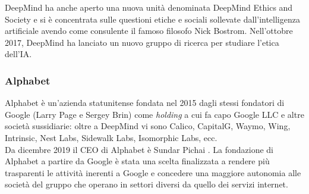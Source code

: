 {	\par DeepMind ha anche aperto una nuova unità denominata DeepMind Ethics and Society e si è concentrata sulle questioni etiche e sociali sollevate dall'intelligenza artificiale avendo come consulente il famoso filosofo Nick Bostrom. Nell'ottobre 2017, DeepMind ha lanciato un nuovo gruppo di ricerca per studiare l'etica dell'IA.
	
	\subsubsection{Alphabet}
	Alphabet è un'azienda statunitense fondata nel 2015 dagli stessi fondatori di Google (Larry Page e Sergey Brin) come \textit{holding} a cui fa capo Google LLC e altre società sussidiarie: oltre a DeepMind vi sono Calico, CapitalG, Waymo, Wing, Intrinsic, Nest Labs, Sidewalk Labs, Isomorphic Labs, ecc.\\ 
	Da dicembre 2019 il CEO di Alphabet è Sundar Pichai \supercite{cnbc}.
	La fondazione di Alphabet a partire da Google è stata una scelta finalizzata a rendere più trasparenti le attività inerenti a Google e concedere una maggiore autonomia alle società del gruppo che operano in settori diversi da quello dei servizi internet.
}

\clearpage














